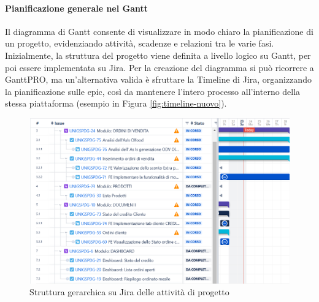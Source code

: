             \paragraph{Pianificazione generale nel Gantt}
            Il diagramma di Gantt consente di visualizzare in modo chiaro la pianificazione di un progetto, evidenziando
            attività, scadenze e relazioni tra le varie fasi. Inizialmente, la struttura del progetto viene definita a
            livello logico su Gantt, per poi essere implementata su Jira. Per la creazione del diagramma si può ricorrere
            a GanttPRO, ma un’alternativa valida è sfruttare la Timeline di Jira, organizzando la pianificazione sulle epic,
            così da mantenere l’intero processo all’interno della stessa piattaforma (esempio in Figura \ref{fig:timeline-nuovo}).

            \begin{figure}
                \centering
                \includegraphics[scale=0.6]{figures/GanttJiraNuovo.png}
                \caption{Struttura gerarchica su Jira delle attività di progetto}
                \label{fig:gantt-nuovo}
            \end{figure}
